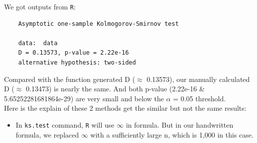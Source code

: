 \documentclass{article} %
\begin{document}
 

\vspace{.3cm}

\noindent We got outputs from \texttt{R}:
\begin{verbatim}
	Asymptotic one-sample Kolmogorov-Smirnov test
	
	data:  data
	D = 0.13573, p-value = 2.22e-16
	alternative hypothesis: two-sided
\end{verbatim}

\noindent Compared with the function generated D ($\approx$ 0.13573), our manually calculated D ($\approx$ 0.13473) is nearly the same. And both p-value (2.22e-16 \& 5.65252281681864e-29) are very small and below the $\alpha$ = 0.05 threshold.\\

\noindent Here is the explain of these 2 methods get the similar but not the same results:\\

\begin{itemize}
	\item In \texttt{ks.test} command, \texttt{R} will use $\infty$ in formula. But in our handwritten formula, we replaced $\infty$ with a sufficiently large n, which is 1,000 in this case.
\end{itemize}

\vspace{.3cm}
\end{document}
